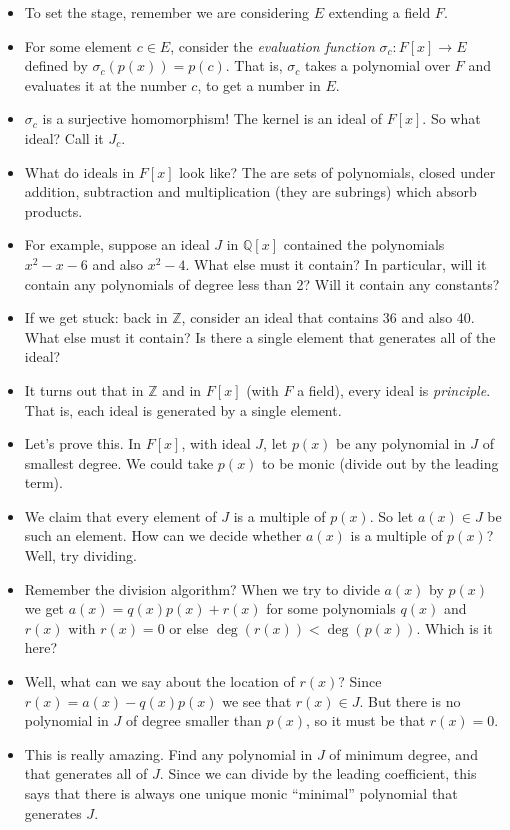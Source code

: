 \documentclass[12pt]{article}
\theoremstyle{plain}
\theoremstyle{definition}
\theoremstyle{remark}
\def\Z{\mathbb Z}
\def\Q{\mathbb Q}
\begin{document}
\begin{itemize}
\item To set the stage, remember we are considering $E$ extending a field $F$.
\item For some element $c \in E$, consider the {\em evaluation function} $\sigma_c:F[x] \to E$ defined by $\sigma_c(p(x)) = p(c)$.  That is, $\sigma_c$ takes a polynomial over $F$ and evaluates it at the number $c$, to get a number in $E$. 
\item $\sigma_c$ is a surjective homomorphism!  The kernel is an ideal of $F[x]$.  So what ideal?  Call it $J_c$.

\item What do ideals in $F[x]$ look like?  The are sets of polynomials, closed under addition, subtraction and multiplication (they are subrings) which absorb products.

\item For example, suppose an ideal $J$ in $\Q[x]$ contained the polynomials $x^2 - x - 6$ and also $x^2 - 4$.  What else must it contain?  In particular, will it contain any polynomials of degree less than 2?  Will it contain any constants?

\item If we get stuck: back in $\Z$, consider an ideal that contains $36$ and also $40$.  What else must it contain?  Is there a single element that generates all of the ideal?

\item It turns out that in $\Z$ and in $F[x]$ (with $F$ a field), every ideal is \emph{principle}.  That is, each ideal is generated by a single element.

\item Let's prove this.  In $F[x]$, with ideal $J$, let $p(x)$ be any polynomial in $J$ of smallest degree.  We could take $p(x)$ to be monic (divide out by the leading term).

\item We claim that every element of $J$ is a multiple of $p(x)$.  So let $a(x) \in J$ be such an element.  How can we decide whether $a(x)$ is a multiple of $p(x)$?  Well, try dividing.

\item Remember the division algorithm?  When we try to divide $a(x)$ by $p(x)$ we get $a(x) = q(x)p(x) + r(x)$ for some polynomials $q(x)$ and $r(x)$ with $r(x) = 0$ or else $\deg(r(x)) < \deg(p(x))$.  Which is it here?

\item Well, what can we say about the location of $r(x)$?  Since $r(x) = a(x) - q(x)p(x)$ we see that $r(x) \in J$.  But there is no polynomial in $J$ of degree smaller than $p(x)$, so it must be that $r(x) = 0$.  

\item This is really amazing.  Find any polynomial in $J$ of minimum degree, and that generates all of $J$.  Since we can divide by the leading coefficient, this says that there is always one unique monic ``minimal'' polynomial that generates $J$.  

\end{itemize}
\end{document}
